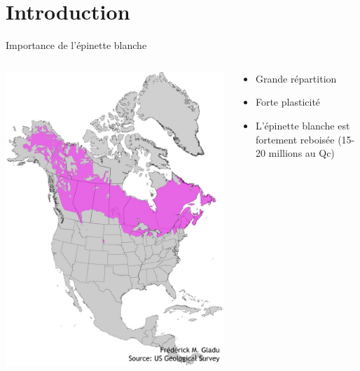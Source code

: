 \documentclass{beamer}
\begin{document}
\section{Introduction}
\begin{frame}{Importance de l'épinette blanche}
	
\begin{columns}
	
	\begin{column}{0.45\textwidth}
		\includegraphics[width=\textwidth]{distribution.jpg}
	\end{column}
	
	\begin{column}{0.4\textwidth}
		\begin{itemize} 
			\item Grande répartition  \\
			\vspace{0.5cm}
			\item Forte plasticité\\
			\vspace{0.5cm}
			\item L'épinette blanche est fortement reboisée (15-20 millions au Qc)
		\end{itemize}	
	\end{column}
	
\end{columns}

\end{frame}
\end{document}
